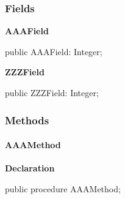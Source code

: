 \documentclass{report}
\newif\ifpdf
\begin{document}
\subsubsection*{\large{\textbf{Fields}}\normalsize\hspace{1ex}\hfill}
\begin{list}{}{
\setlength{\itemindent}{0cm}
\setlength{\listparindent}{0cm}
\setlength{\leftmargin}{\evensidemargin}
\addtolength{\leftmargin}{\tmplength}
\settowidth{\labelsep}{X}
\addtolength{\leftmargin}{\labelsep}
\setlength{\labelwidth}{\tmplength}
}
\label{ok_sorting.TMyClass-AAAField}
\item[\textbf{AAAField}\hfill]
\ifpdf
\begin{flushleft}
\fi
\begin{ttfamily}
public AAAField: Integer;\end{ttfamily}

\ifpdf
\end{flushleft}
\fi


\par  \label{ok_sorting.TMyClass-ZZZField}
\item[\textbf{ZZZField}\hfill]
\ifpdf
\begin{flushleft}
\fi
\begin{ttfamily}
public ZZZField: Integer;\end{ttfamily}

\ifpdf
\end{flushleft}
\fi


\par  \end{list}
\subsubsection*{\large{\textbf{Methods}}\normalsize\hspace{1ex}\hfill}
\paragraph*{AAAMethod}\hspace*{\fill}

\label{ok_sorting.TMyClass-AAAMethod}
\begin{list}{}{
\setlength{\itemindent}{0cm}
\setlength{\listparindent}{0cm}
\setlength{\leftmargin}{\evensidemargin}
\addtolength{\leftmargin}{\tmplength}
\settowidth{\labelsep}{X}
\addtolength{\leftmargin}{\labelsep}
\setlength{\labelwidth}{\tmplength}
}
\item[\textbf{Declaration}\hfill]
\ifpdf
\begin{flushleft}
\fi
\begin{ttfamily}
public procedure AAAMethod;\end{ttfamily}

\ifpdf
\end{flushleft}
\fi

\end{list}
\end{document}
